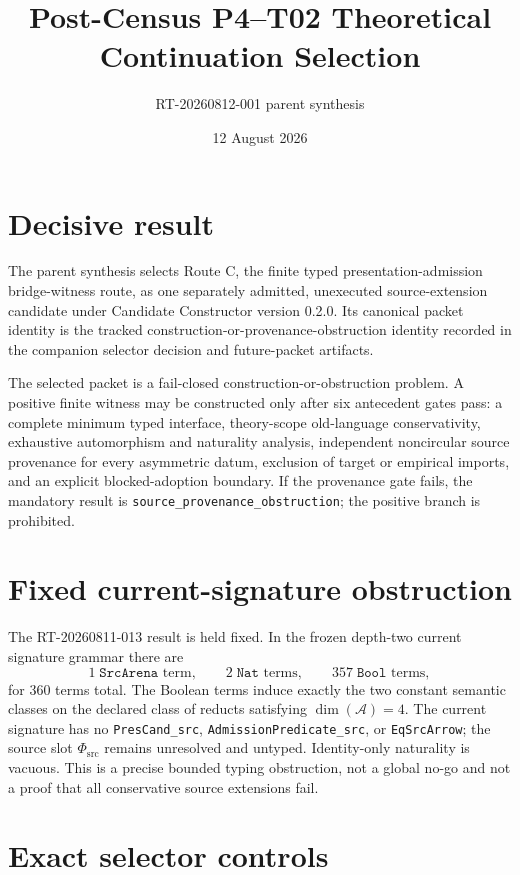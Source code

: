 \documentclass[11pt]{article}
\title{Post-Census P4--T02 Theoretical Continuation Selection}
\author{RT-20260812-001 parent synthesis}
\date{12 August 2026}
\newcommand{\Sub}{\mathcal{A}}
\begin{document}
\maketitle

\section{Decisive result}

The parent synthesis selects Route C, the finite typed
presentation-admission bridge-witness route, as one separately admitted,
unexecuted source-extension candidate under Candidate Constructor version
0.2.0.  Its canonical packet identity is the tracked
construction-or-provenance-obstruction identity recorded in the companion
selector decision and future-packet artifacts.

The selected packet is a fail-closed construction-or-obstruction problem.  A
positive finite witness may be constructed only after six antecedent gates
pass: a complete minimum typed interface, theory-scope old-language
conservativity, exhaustive automorphism and naturality analysis, independent
noncircular source provenance for every asymmetric datum, exclusion of target
or empirical imports, and an explicit blocked-adoption boundary.  If the
provenance gate fails, the mandatory result is
\texttt{source\_provenance\_obstruction}; the positive branch is prohibited.

\section{Fixed current-signature obstruction}

The RT-20260811-013 result is held fixed.  In the frozen depth-two current
signature grammar there are
\[
  1\;\texttt{SrcArena}\text{ term},\qquad
  2\;\texttt{Nat}\text{ terms},\qquad
  357\;\texttt{Bool}\text{ terms},
\]
for 360 terms total.  The Boolean terms induce exactly the two constant
semantic classes on the declared class of reducts satisfying
$\dim(\Sub)=4$.  The current signature has no
\texttt{PresCand\_src}, \texttt{AdmissionPredicate\_src}, or
\texttt{EqSrcArrow}; the source slot $\Phi_{\mathrm{src}}$ remains unresolved
and untyped.  Identity-only naturality is vacuous.  This is a precise bounded
typing obstruction, not a global no-go and not a proof that all conservative
source extensions fail.

\section{Exact selector controls}
\end{document}
